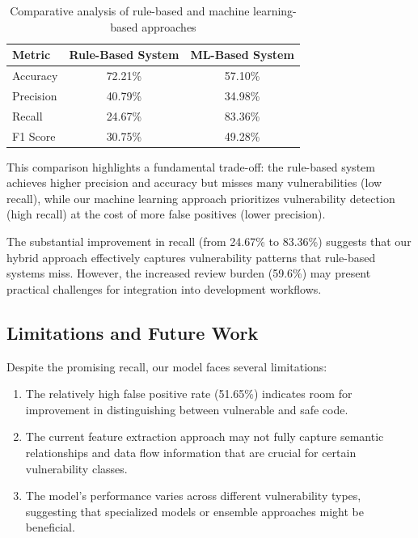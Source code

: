 \documentclass{article}
\begin{document}
\begin{table}[ht]
\centering
\begin{tabular}{lcc}
\hline
\textbf{Metric} & \textbf{Rule-Based System} & \textbf{ML-Based System} \\
\hline
Accuracy & 72.21\% & 57.10\% \\
Precision & 40.79\% & 34.98\% \\
Recall & 24.67\% & 83.36\% \\
F1 Score & 30.75\% & 49.28\% \\
\hline
\end{tabular}
\caption{Comparative analysis of rule-based and machine learning-based approaches}
\label{tab:comparative_analysis}
\end{table}

This comparison highlights a fundamental trade-off: the rule-based system achieves higher precision and accuracy but misses many vulnerabilities (low recall), while our machine learning approach prioritizes vulnerability detection (high recall) at the cost of more false positives (lower precision).

The substantial improvement in recall (from 24.67\% to 83.36\%) suggests that our hybrid approach effectively captures vulnerability patterns that rule-based systems miss. However, the increased review burden (59.6\%) may present practical challenges for integration into development workflows.

\subsection{Limitations and Future Work}

Despite the promising recall, our model faces several limitations:

\begin{enumerate}
    \item The relatively high false positive rate (51.65\%) indicates room for improvement in distinguishing between vulnerable and safe code.
    
    \item The current feature extraction approach may not fully capture semantic relationships and data flow information that are crucial for certain vulnerability classes.
    
    \item The model's performance varies across different vulnerability types, suggesting that specialized models or ensemble approaches might be beneficial.
\end{enumerate}
\end{document}
